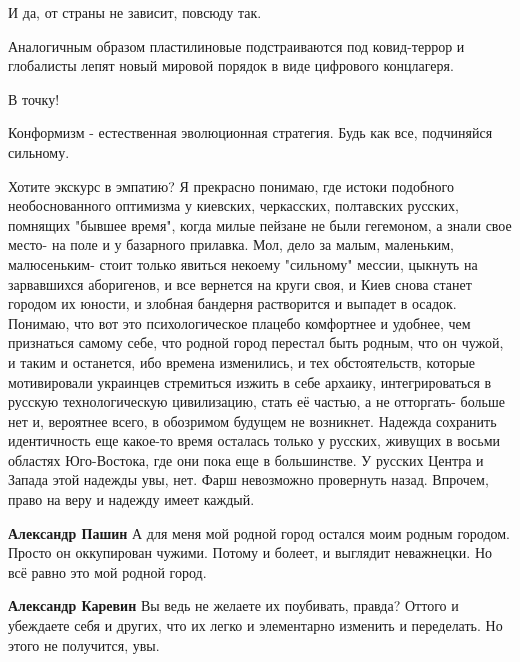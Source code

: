 \begin{itemize}
И да, от страны не зависит, повсюду так.


Аналогичным образом пластилиновые подстраиваются под ковид-террор и глобалисты
лепят новый мировой порядок в виде цифрового концлагеря.


В точку!


Конформизм - естественная эволюционная стратегия. Будь как все, подчиняйся сильному.


Хотите экскурс в эмпатию? Я прекрасно понимаю, где истоки подобного
необоснованного оптимизма у киевских, черкасских, полтавских русских, помнящих
"бывшее время", когда милые пейзане не были гегемоном, а знали свое место- на
поле и у базарного прилавка. Мол, дело за малым, маленьким, малюсеньким- стоит
только явиться некоему "сильному" мессии, цыкнуть на зарвавшихся аборигенов, и
все вернется на круги своя, и Киев снова станет городом их юности, и злобная
бандерня растворится и выпадет в осадок. Понимаю, что вот это психологическое
плацебо комфортнее и удобнее, чем признаться самому себе, что родной город
перестал быть родным, что он чужой, и таким и останется, ибо времена
изменились, и тех обстоятельств, которые мотивировали украинцев стремиться
изжить в себе архаику, интегрироваться в русскую технологическую цивилизацию,
стать её частью, а не отторгать- больше нет и, вероятнее всего, в обозримом
будущем не возникнет. Надежда сохранить идентичность еще какое-то время
осталась только у русских, живущих в восьми областях Юго-Востока, где они пока
еще в большинстве. У русских Центра и Запада этой надежды увы, нет. Фарш
невозможно провернуть назад. Впрочем, право на веру и надежду имеет каждый.

\begin{itemize} %
\textbf{Александр Пашин} А для меня мой родной город остался моим родным городом. Просто он оккупирован чужими. Потому и болеет, и выглядит неважнецки. Но всё равно это мой родной город.

\textbf{Александр Каревин} Вы ведь не желаете их поубивать, правда? Оттого и убеждаете себя и других, что их легко и элементарно изменить и переделать. Но этого не получится, увы.


\end{itemize}
\end{itemize}
